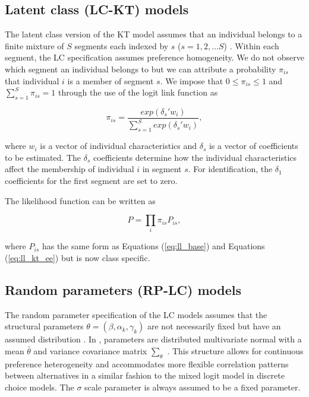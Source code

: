\hypertarget{latent-class-lc-kt-models}{%
\subsection{Latent class (LC-KT)
models}\label{latent-class-lc-kt-models}}

The latent class version of the KT model assumes that an individual
belongs to a finite mixture of \(S\) segments each indexed by \(s\)
(\(s=1,2,...S\)) \citep{sobhanilatent2013, kuriyamalatent2010}. Within
each segment, the LC specification assumes preference homogeneity. We do
not observe which segment an individual belongs to but we can attribute
a probability \(\pi_{is}\) that individual \(i\) is a member of segment
\(s\). We impose that \(0 \leq \pi_{is} \leq 1\) and
\(\sum^S_{s=1} \pi_{is} = 1\) through the use of the logit link function
as

\begin{equation}
\pi_{is} = \frac{exp(\delta_s'w_i)}{\sum^S_{s=1}exp(\delta_s'w_i)},
\end{equation}

\noindent where \(w_i\) is a vector of individual characteristics and
\(\delta_s\) is a vector of coefficients to be estimated. The
\(\delta_s\) coefficients determine how the individual characteristics
affect the membership of individual \(i\) in segment \(s\). For
identification, the \(\delta_1\) coefficients for the first segment are
set to zero.

The likelihood function can be written as

\begin{equation}
P = \prod_{i} \pi_{is}P_{is},
\end{equation}

where \(P_{is}\) has the same form as Equations (\ref{eq:ll_base}) and
Equations (\ref{eq:ll_kt_ee}) but is now class specific.

\hypertarget{random-parameters-rp-lc-models}{%
\subsection{Random parameters (RP-LC)
models}\label{random-parameters-rp-lc-models}}

The random parameter specification of the LC models assumes that the
structural parameters \(\theta = (\beta, \alpha_k , \gamma_k)\) are not
necessarily fixed but have an assumed distribution
\citep{bhatmultiple2008}. In , parameters are distributed
multivariate normal with a mean \(\bar{\theta}\) and variance covariance
matrix \(\sum_{\theta}\) \citep{vonhaefenkuhn-tucker2005}. This
structure allows for continuous preference heterogeneity and
accommodates more flexible correlation patterns between alternatives in
a similar fashion to the mixed logit model in discrete choice models.
The \(\sigma\) scale parameter is always assumed to be a fixed
parameter.

